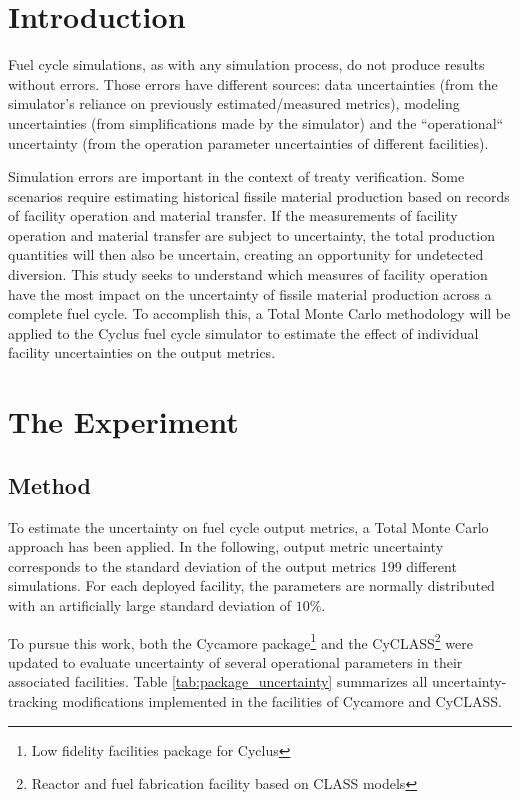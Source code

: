 \documentclass{anstrans}
\title{}
\author{Baptiste Mouginot,$^{*}$ Kathryn Mummah,$^{*}$ Paul P.H.  Wilson$^{*}$}
\institute{
$^{*}$University of Wisconsin-Madison, WI
}
\begin{document}
\section{Introduction}

Fuel cycle simulations, as with any simulation process, do not produce results
without errors.  Those errors have different sources: data uncertainties (from
the simulator's reliance on previously estimated/measured metrics), modeling
uncertainties (from simplifications made by the simulator) and the
``operational`` uncertainty (from the operation parameter uncertainties of
different facilities).

Simulation errors are important in the context of treaty verification. 
Some scenarios require estimating historical fissile
material production based on records of facility operation and material
transfer.  If the measurements of facility operation and material transfer are
subject to uncertainty, the total production quantities will then also be
uncertain, creating an opportunity for undetected diversion.  This study seeks
to understand which measures of facility operation have the most impact on the
uncertainty of fissile material production across a complete fuel cycle.
To accomplish this, a Total Monte Carlo methodology will be applied to the Cyclus
fuel cycle simulator \cite{cyclus} to estimate the effect of individual facility uncertainties on the output metrics.

\section{The Experiment}

\subsection{Method}

To estimate the uncertainty on fuel cycle output metrics, a Total Monte
Carlo approach has been applied.  In the following, output metric uncertainty
corresponds to the standard deviation of the output metrics 199
different simulations.  For each deployed facility, the
parameters are normally distributed with an artificially large standard
deviation of $10\%$.

To pursue this work, both the Cycamore\cite{cycamore} package\footnote{Low
fidelity facilities package for Cyclus} and the
CyCLASS\footnote{Reactor and fuel fabrication facility based on CLASS\cite{CLASS} models} were
updated\cite{mouginot_2018, cyclass} to evaluate uncertainty of several
operational parameters in their associated facilities.  Table
\ref{tab:package_uncertainty} summarizes all uncertainty-tracking modifications implemented in the
facilities of Cycamore and CyCLASS.
\end{document}
